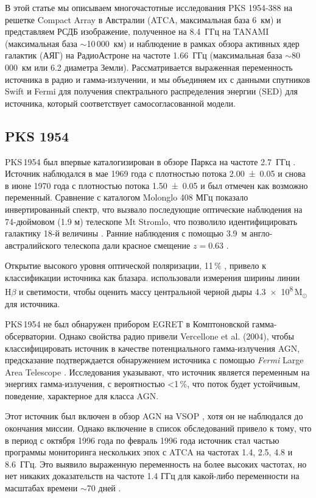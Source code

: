 В этой статье мы описываем многочастотные исследования PKS 1954-388 на решетке Compact Array в
Австралии (ATCA, максимальная база 6~км) и представляем РСДБ изображение, полученное на
8.4~ГГц на  TANAMI (максимальная база $\sim$10\,000~км) и наблюдение в рамках обзора активных ядер
галактик (АЯГ) на РадиоАстроне на частоте 1.66~ГГц (максимальная база $\sim$80\,000~км или 6.2
диаметра Земли). Рассматривается выраженная переменность источника в радио и гамма-излучении, и мы
объединяем их с данными спутников Swift и Fermi для получения спектрального распределения энергии
(SED) для источника, который соответствует самосогласованной модели.

\subsection{PKS 1954}

PKS\,1954 был впервые каталогизирован в обзоре Паркса на частоте 2.7~ГГц
\cite{Shimmins_1971}. Источник наблюдался в мае 1969 года с плотностью потока
\SI{2.00+-0.05}{\jansky} и снова в июне 1970 года с плотностью потока \SI{1.50+-0.05}{\jansky} и был
отмечен как возможно переменный. Сравнение с каталогом Molonglo 408 МГц показало инвертированный
спектр, что вызвало последующие оптические наблюдения на 74-дюймовом (1.9 м) телескопе Mt Stromlo,
что позволило идентифицировать галактику 18-й величины \cite{Shimmins_1971a}. Ранние наблюдения с
помощью 3.9~м англо-австралийского телескопа дали красное смещение $z = 0.63$ \cite{Browne_1975}.

Открытие высокого уровня оптической поляризации, 11\,\% \cite{Impey_1988}, привело к
классификации источника как блазара. \cite{Oshlack_2002} использовали измерения ширины
линии $\text{H}\beta$ и светимости, чтобы оценить массу центральной черной дыры
\num{4.3e8}\,$\text{M}_\odot$ для источника.

PKS\,1954 не был обнаружен прибором EGRET в Комптоновской гамма-обсерватории. Однако
свойства радио привели Vercellone et al. (2004), чтобы классифицировать источник в качестве
потенциального гамма-излучения AGN, предсказание подтверждается обнаружением источника с помощью
\emph{Fermi} Large Area Telescope \cite{Abdo_2010}. Исследования \cite{Nolan_2012} указывают,
что источник является переменным на энергиях гамма-излучения, с вероятностью <1\,\%, что поток
будет устойчивым, поведение, характерное для класса AGN.

Этот источник был включен в обзор AGN на VSOP \cite{Hirabayashi_2000}, хотя он не наблюдался до
окончания миссии. Однако включение в список обследований привело к тому, что в период с октября 1996
года по февраль 1996 года источник стал частью программы мониторинга нескольких эпох с ATCA на
частотах 1.4, 2.5, 4.8 и 8.6~ГГц. Это выявило выраженную переменность на более высоких частотах, но
нет никаких доказательств на частоте 1.4 ГГц для какой-либо переменности на масштабах времени
$\sim$70 дней \cite{Tingay_2003}.

